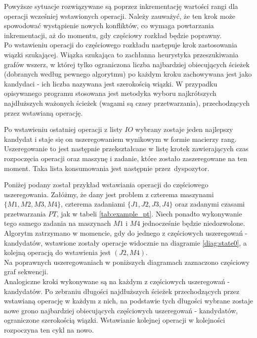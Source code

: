 \documentclass[brudnopis]{xmgr}
\begin{document}
Powyższe sytuacje rozwiązywane są poprzez inkrementację wartości rangi dla operacji wcześniej wstawionych operacji. Należy zauważyć, że ten krok może spowodować wystąpienie nowych konfliktów, co wymaga powtarzania inkrementacji, aż do momentu, gdy częściowy rozkład będzie poprawny.\\

Po wstawieniu operacji do częściowego rozkładu następuje krok zastosowania wiązki szukającej.
Wiązka szukająca to zachłanna heurystyka przeszukiwania grafów wszerz, w której tylko ograniczona liczba najbardziej obiecujących ścieżek (dobranych według pewnego algorytmu) po każdym kroku zachowywana jest jako kandydaci - ich liczba nazywana jest szerokością wiązki.
W przypadku opisywanego programu stosowana jest metodyka wyboru najkrótszych najdłuższych ważonych ścieżek (wagami są czasy przetwarzania), przechodzących przez wstawianą operację.

Po wstawieniu ostatniej operacji z listy $IO$ wybrany zostaje jeden najlepszy kandydat i staje się on uszeregowaniem wynikowym w formie macierzy rang.
Uszeregowanie to jest następnie przekształcane w listę krotek zawierających czas rozpoczęcia operacji oraz maszynę i zadanie, które zostało zaszeregowane na ten moment. Taka lista konsumowania jest następnie przez~dyspozytor.
\medskip

Poniżej podany został przykład wstawiania operacji do częściowego uszeregowania.
Załóżmy, że dany jest problem z czterema maszynami\\
$\{M1, M2, M3, M4\}$, czterema zadaniami $\{J1, J2, J3, J4\}$ oraz zadanymi czasami przetwarzania $PT$, jak w tabeli \ref{tab:example_pt}.
Niech ponadto wykonywanie tego samego zadania na maszynach $M1$ i $M4$ jednocześnie będzie niedozwolone.
Algorytm zatrzymano w momencie, gdy do jednego z częściowych uszeregowań - kandydatów, wstawione zostały operacje widocznie na diagramie \ref{diag:state0}, a kolejną operacją do wstawienia jest $(J2, M4)$.\\
Na poprawnych uszeregowaniach w poniższych diagramach zaznaczono częściowy graf sekwencji.\\
Analogiczne kroki wykonywane są na każdym z częściowych uszeregowań - kandydatów.
Po zebraniu długości najdłuższych ścieżek przechodzących przez wstawianą operację w każdym z nich, na podstawie tych długości wybrane zostaje nowe grono najbardziej obiecujących częściowych uszeregowań - kandydatów, ograniczone szerokością wiązki.
Wstawianie kolejnej operacji w kolejności rozpoczyna ten cykl na nowo.
\end{document}
